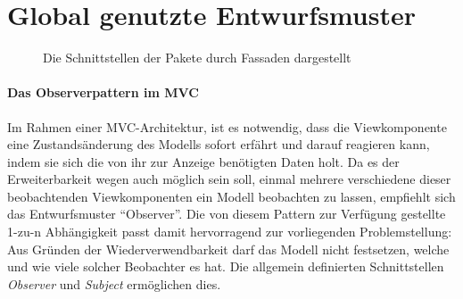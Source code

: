 \documentclass[parskip=full]{scrartcl}
\begin{document}
\section{Global genutzte Entwurfsmuster}
\begin{figure}[!h]
\caption{Die Schnittstellen der Pakete durch Fassaden dargestellt}
\label{fig:fassaden}
\end{figure}
\newpage
\paragraph{Das Observerpattern im MVC}
Im Rahmen einer MVC-Architektur, ist es notwendig, dass die Viewkomponente eine Zustandsänderung des Modells sofort erfährt und darauf reagieren kann, indem sie sich die von ihr zur Anzeige benötigten Daten holt. Da es der Erweiterbarkeit wegen auch möglich sein soll, einmal mehrere verschiedene dieser beobachtenden Viewkomponenten ein Modell beobachten zu lassen, empfiehlt sich das Entwurfsmuster \enquote{Observer}. Die von diesem Pattern zur Verfügung gestellte 1-zu-n Abhängigkeit passt damit hervorragend zur vorliegenden Problemstellung: Aus Gründen der Wiederverwendbarkeit darf das Modell nicht festsetzen, welche und wie viele solcher Beobachter es hat. Die allgemein definierten Schnittstellen \textit{Observer} und \textit{Subject} ermöglichen dies. 
\end{document}
